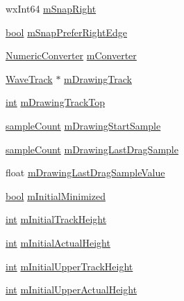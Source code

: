 \begin{DoxyCompactItemize}
wx\+Int64 \hyperlink{class_track_panel_a39bd545d06508b322799058e6cfd3842}{m\+Snap\+Right}
\item 
\hyperlink{mac_2config_2i386_2lib-src_2libsoxr_2soxr-config_8h_abb452686968e48b67397da5f97445f5b}{bool} \hyperlink{class_track_panel_a38bacce5d4afbdf8fd05ec65cdd3b0d3}{m\+Snap\+Prefer\+Right\+Edge}
\item 
\hyperlink{class_numeric_converter}{Numeric\+Converter} \hyperlink{class_track_panel_ac12384f2e976cb0cc56f2e6b8ca22de0}{m\+Converter}
\item 
\hyperlink{class_wave_track}{Wave\+Track} $\ast$ \hyperlink{class_track_panel_a9e072ae51c9cfe5637a5aca0ddbe1251}{m\+Drawing\+Track}
\item 
\hyperlink{xmltok_8h_a5a0d4a5641ce434f1d23533f2b2e6653}{int} \hyperlink{class_track_panel_af2d95ea945c2e60af2e7277a09dc5317}{m\+Drawing\+Track\+Top}
\item 
\hyperlink{include_2audacity_2_types_8h_afa427e1f521ea5ec12d054e8bd4d0f71}{sample\+Count} \hyperlink{class_track_panel_afbfde4aa5fba18839a21de39a75856bb}{m\+Drawing\+Start\+Sample}
\item 
\hyperlink{include_2audacity_2_types_8h_afa427e1f521ea5ec12d054e8bd4d0f71}{sample\+Count} \hyperlink{class_track_panel_ab5839208cbf7b0a2b5c6f174c7ef8971}{m\+Drawing\+Last\+Drag\+Sample}
\item 
float \hyperlink{class_track_panel_aaf6a9b516234e90fd8f9580f412c5013}{m\+Drawing\+Last\+Drag\+Sample\+Value}
\item 
\hyperlink{mac_2config_2i386_2lib-src_2libsoxr_2soxr-config_8h_abb452686968e48b67397da5f97445f5b}{bool} \hyperlink{class_track_panel_ac65e65ebed3314ddb87c5b6c39795392}{m\+Initial\+Minimized}
\item 
\hyperlink{xmltok_8h_a5a0d4a5641ce434f1d23533f2b2e6653}{int} \hyperlink{class_track_panel_a5a8b094d437f6aa699a5d28084cbfa46}{m\+Initial\+Track\+Height}
\item 
\hyperlink{xmltok_8h_a5a0d4a5641ce434f1d23533f2b2e6653}{int} \hyperlink{class_track_panel_a869fb10d3f2ab3181553b3047f664ac6}{m\+Initial\+Actual\+Height}
\item 
\hyperlink{xmltok_8h_a5a0d4a5641ce434f1d23533f2b2e6653}{int} \hyperlink{class_track_panel_ad8dad5601fc0fdaaa4b59ec6598caa16}{m\+Initial\+Upper\+Track\+Height}
\item 
\hyperlink{xmltok_8h_a5a0d4a5641ce434f1d23533f2b2e6653}{int} \hyperlink{class_track_panel_aeeb50d3d2469be1829175425b1dc58c3}{m\+Initial\+Upper\+Actual\+Height}
\item 

\end{DoxyCompactItemize}
